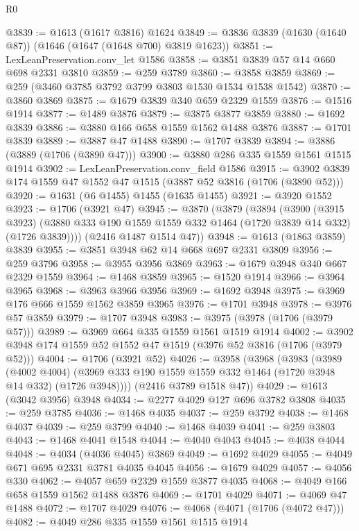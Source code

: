 \begin{lexlean}{R0}
\begin{coremodule}
@3839 := @1613 (@1617 @3816) @1624
@3849 := @3836 @3839 (@1630 (@1640 @87)) (@1646 (@1647 (@1648 @700) @3819 @1623))
@3851 := LexLeanPreservation.conv_let @1586
@3858 := @3851 @3839 @57 @14 @660 @698 @2331 @3810
@3859 := @259 @3789
@3860 := @3858 @3859
@3869 := @259 (@3460 @3785 @3792 @3799 @3803 @1530 @1534 @1538 @1542)
@3870 := @3860 @3869
@3875 := @1679 @3839 @340 @659 @2329 @1559
@3876 := @1516 @1914
@3877 := @1489 @3876
@3879 := @3875 @3877 @3859
@3880 := @1692 @3839
@3886 := @3880 @166 @658 @1559 @1562 @1488 @3876
@3887 := @1701 @3839
@3889 := @3887 @47 @1488
@3890 := @1707 @3839
@3894 := @3886 (@3889 (@1706 (@3890 @47)))
@3900 := @3880 @286 @335 @1559 @1561 @1515 @1914
@3902 := LexLeanPreservation.conv_field @1586
@3915 := @3902 @3839 @174 @1559 @47 @1552 @47 @1515 (@3887 @52 @3816 (@1706 (@3890 @52)))
@3920 := @1631 (@6 @1455) @1455 (@1635 @1455)
@3921 := @3920 @1552
@3923 := @1706 (@3921 @47)
@3945 := @3870
    (@3879
      (@3894
        (@3900
          (@3915 @3923)
          (@3880 @333 @190 @1559 @1559 @332 @1464 (@1720 @3839 @14 @332) (@1726 @3839))))
      (@2416 @1487 @1514 @47))
@3948 := @1613 (@1863 @3859) @3839
@3955 := @3851 @3948 @62 @14 @668 @697 @2331 @3809
@3956 := @259 @3796
@3958 := @3955 @3956 @3869
@3963 := @1679 @3948 @340 @667 @2329 @1559
@3964 := @1468 @3859
@3965 := @1520 @1914
@3966 := @3964 @3965
@3968 := @3963 @3966 @3956
@3969 := @1692 @3948
@3975 := @3969 @176 @666 @1559 @1562 @3859 @3965
@3976 := @1701 @3948
@3978 := @3976 @57 @3859
@3979 := @1707 @3948
@3983 := @3975 (@3978 (@1706 (@3979 @57)))
@3989 := @3969 @664 @335 @1559 @1561 @1519 @1914
@4002 := @3902 @3948 @174 @1559 @52 @1552 @47 @1519 (@3976 @52 @3816 (@1706 (@3979 @52)))
@4004 := @1706 (@3921 @52)
@4026 := @3958
    (@3968
      (@3983
        (@3989
          (@4002 @4004)
          (@3969 @333 @190 @1559 @1559 @332 @1464 (@1720 @3948 @14 @332) (@1726 @3948))))
      (@2416 @3789 @1518 @47))
@4029 := @1613 (@3042 @3956) @3948
@4034 := @2277 @4029 @127 @696 @3782 @3808
@4035 := @259 @3785
@4036 := @1468 @4035
@4037 := @259 @3792
@4038 := @1468 @4037
@4039 := @259 @3799
@4040 := @1468 @4039
@4041 := @259 @3803
@4043 := @1468 @4041 @1548
@4044 := @4040 @4043
@4045 := @4038 @4044
@4048 := @4034 (@4036 @4045) @3869
@4049 := @1692 @4029
@4055 := @4049 @671 @695 @2331 @3781 @4035 @4045
@4056 := @1679 @4029
@4057 := @4056 @330
@4062 := @4057 @659 @2329 @1559 @3877 @4035
@4068 := @4049 @166 @658 @1559 @1562 @1488 @3876
@4069 := @1701 @4029
@4071 := @4069 @47 @1488
@4072 := @1707 @4029
@4076 := @4068 (@4071 (@1706 (@4072 @47)))
@4082 := @4049 @286 @335 @1559 @1561 @1515 @1914

\end{coremodule}
\end{lexlean}
